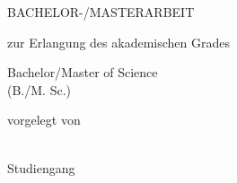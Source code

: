 
\renewcommand{\today}{\ifnum\number\day<10 0\fi \number\day.\space%
\ifcase \month \or Januar \or Februar \or März \or April \or Mai %
\or Juni \or Juli \or August \or September \or Oktober \or November \or Dezember \fi %
\number \year}

\begin{titlepage}
	\begin{addmargin}[-1cm]{-3cm}
    \begin{center}
        \large
		
		\mySchool \\ \vspace{0.6em} \myUni \\ \vspace{0.6em} \myFaculty \\ \vspace{0.6em} \myDepartment{} \\

        \hfill

        \vfill

        \begingroup
            \color{Maroon}\LARGE{\spacedallcaps{\myTitle}} \\ \bigskip
        \endgroup


        \vfill \bigskip

        {\Huge BACHELOR-/MASTERARBEIT} \vfill\medskip

        zur Erlangung des akademischen Grades \\\vfill

        {\LARGE Bachelor/Master of Science}\\
        (B./M. Sc.)\\\vfill


		vorgelegt von\\\vfill

        \textbf{\myName}\\
		Studiengang \mySubject{}\vfill%


\end{center}
\end{addmargin}
\end{titlepage}
